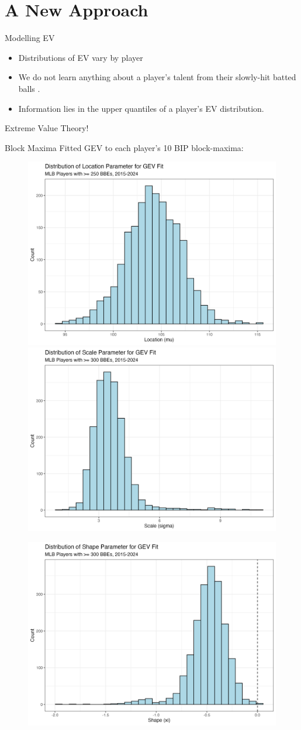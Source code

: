 \documentclass{beamer}
\begin{document}
\section{A New Approach}
\begin{frame}{Modelling EV}
    \begin{itemize}
        \item Distributions of EV vary by player
        \item We do not learn anything about a player's talent from their slowly-hit batted balls \cite{tangoBestSpeed}.
        \item Information lies in the upper quantiles of a player's EV distribution. 
    \end{itemize}
    Extreme Value Theory!
\end{frame}

\begin{frame}[allowframebreaks]{Block Maxima}
    Fitted GEV to each player's 10 BIP block-maxima:
    \begin{figure}
        \includegraphics[width=0.49\linewidth]{plots/location.png}
        \hfill
        \includegraphics[width=0.49\linewidth]{plots/scale.png}
    \end{figure}
    \begin{figure}
        \centering
        \includegraphics[width=0.85\linewidth]{plots/shape.png}
    \end{figure}
\end{frame}
\end{document}
